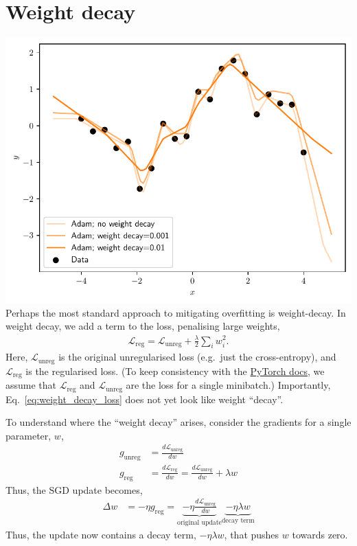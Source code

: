 \documentclass{article}
\newcommand{\dt}[2][]{\frac{d #1}{d #2}}
\newcommand{\0}{\mathbf{0}}
\renewcommand{\L}{\mathcal{L}}
\newcommand{\Lreg}{\L_\text{reg}}
\newcommand{\Lunreg}{\L_\text{unreg}}
\newcommand{\dLreg}{\dt[\Lreg]}
\newcommand{\dLunreg}{\dt[\Lunreg]}
\newcommand{\greg}{g_\text{reg}}
\newcommand{\gunreg}{g_\text{unreg}}
\begin{document}
\section{Weight decay}
\includegraphics[width=\textwidth]{weight_decay.pdf}
Perhaps the most standard approach to mitigating overfitting is weight-decay.
In weight decay, we add a term to the loss, penalising large weights,
\begin{align}
  \label{eq:weight_decay_loss}
  \Lreg = \Lunreg + \tfrac{\lambda}{2} \sum_i w_i^2.
\end{align}
Here, $\Lunreg$ is the original unregularised loss (e.g.\ just the cross-entropy), and $\Lreg$ is the regularised loss.
(To keep consistency with the \href{https://pytorch.org/docs/stable/generated/torch.optim.SGD.html}{PyTorch docs}, we assume that $\Lreg$ and $\Lunreg$ are the loss for a single minibatch.)
Importantly, Eq.~\eqref{eq:weight_decay_loss} does not yet look like weight ``decay''.  

To understand where the ``weight decay'' arises, consider the gradients for a single parameter, $w$,
\begin{align}
  \gunreg &= \dLunreg{w}\\
  \greg &= \dLreg{w} = \dLunreg{w} + \lambda w
\end{align}
Thus, the SGD update becomes,
\begin{align}
  \Delta w &= - \eta \greg = \underbrace{- \eta \dLunreg{w}}_\text{original update} \underbrace{- \eta \lambda w}_\text{decay term}
\end{align}
Thus, the update now contains a decay term, $-\eta \lambda w$, that pushes $w$ towards zero.
\end{document}
